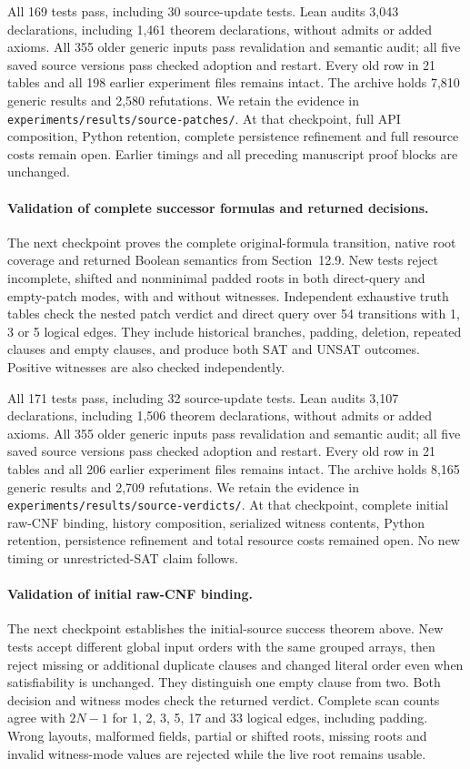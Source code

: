 \documentclass[11pt,a4paper]{article}
\numberwithin{equation}{section}
\theoremstyle{plain}
\theoremstyle{definition}
\theoremstyle{remark}
\begin{document}
All 169 tests pass, including 30 source-update tests. Lean audits 3,043 declarations, including 1,461 theorem declarations, without admits or added axioms. All 355 older generic inputs pass revalidation and semantic audit; all five saved source versions pass checked adoption and restart. Every old row in 21 tables and all 198 earlier experiment files remains intact. The archive holds 7,810 generic results and 2,580 refutations. We retain the evidence in \texttt{experiments/results/source-patches/}. At that checkpoint, full API composition, Python retention, complete persistence refinement and full resource costs remain open. Earlier timings and all preceding manuscript proof blocks are unchanged.

\paragraph{Validation of complete successor formulas and returned decisions.}
The next checkpoint proves the complete original-formula transition, native root coverage and returned Boolean semantics from Section~12.9. New tests reject incomplete, shifted and nonminimal padded roots in both direct-query and empty-patch modes, with and without witnesses. Independent exhaustive truth tables check the nested patch verdict and direct query over 54 transitions with 1, 3 or 5 logical edges. They include historical branches, padding, deletion, repeated clauses and empty clauses, and produce both SAT and UNSAT outcomes. Positive witnesses are also checked independently.

All 171 tests pass, including 32 source-update tests. Lean audits 3,107 declarations, including 1,506 theorem declarations, without admits or added axioms. All 355 older generic inputs pass revalidation and semantic audit; all five saved source versions pass checked adoption and restart. Every old row in 21 tables and all 206 earlier experiment files remains intact. The archive holds 8,165 generic results and 2,709 refutations. We retain the evidence in \texttt{experiments/results/source-verdicts/}. At that checkpoint, complete initial raw-CNF binding, history composition, serialized witness contents, Python retention, persistence refinement and total resource costs remained open. No new timing or unrestricted-SAT claim follows.



\paragraph{Validation of initial raw-CNF binding.}
The next checkpoint establishes the initial-source success theorem above. New tests accept different global input orders with the same grouped arrays, then reject missing or additional duplicate clauses and changed literal order even when satisfiability is unchanged. They distinguish one empty clause from two. Both decision and witness modes check the returned verdict. Complete scan counts agree with $2N-1$ for 1, 2, 3, 5, 17 and 33 logical edges, including padding. Wrong layouts, malformed fields, partial or shifted roots, missing roots and invalid witness-mode values are rejected while the live root remains usable.
\end{document}
